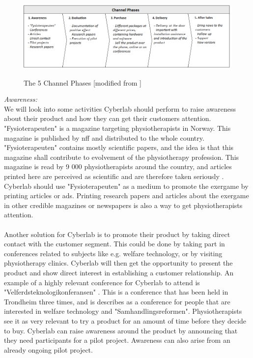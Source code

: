 \begin{figure}
\centering
\scalebox{0.60}
{\includegraphics{channels}}
\caption[The 5 Channel Phases]{The 5 Channel Phases [modified from \cite{osterwalder}\cite{osterwalderthesis}]}
\label{fig:Channels}
\end{figure}

\emph{Awareness:} \\ 
We will look into some activities Cyberlab should perform to raise awareness about their product and how they can get their customers attention. "Fysioterapeuten" is a magazine targeting physiotherapists in Norway. This magazine is published by \ac{nff} and distributed to the whole country. "Fysioterapeuten" contains mostly scientific papers, and the idea is that this magazine shall contribute to evolvement of the physiotherapy profession. This magazine is read by 9 000 physiotherapists around the country, and articles printed here are perceived as scientific and are therefore taken seriously \cite{fysioomoss}. Cyberlab should use "Fysioterapeuten" as a medium to promote the exergame by printing articles or ads. Printing research papers and articles about the exergame in other credible magazines or newspapers is also a way to get physiotherapists attention. \\ \\
Another solution for Cyberlab is to promote their product by taking direct contact with the customer segment. This could be done by taking part in conferences related to subjects like e.g. welfare technology, or by visiting physiotherapy clinics. Cyberlab will then get the opportunity to present the product and show direct interest in establishing a customer relationship. An example of a highly relevant conference for Cyberlab to attend is "Velferdsteknologikonferansen" \cite{conference}. This is a conference that has been held in Trondheim three times, and is describes as a conference for people that are interested in welfare technology and "Samhandlingsreformen". Physiotherapists see it as very relevant to try a product for an amount of time before they decide to buy. Cyberlab can raise awareness around the product by announcing that they need participants for a pilot project. Awareness can also arise from an already ongoing pilot project. \\ \\
